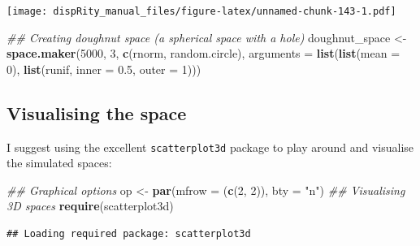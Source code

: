 \documentclass[
]{book}
\newenvironment{Shaded}{\begin{snugshade}}{\end{snugshade}}
\newcommand{\CommentTok}[1]{\textcolor[rgb]{0.56,0.35,0.01}{\textit{#1}}}
\newcommand{\DataTypeTok}[1]{\textcolor[rgb]{0.13,0.29,0.53}{#1}}
\newcommand{\DecValTok}[1]{\textcolor[rgb]{0.00,0.00,0.81}{#1}}
\newcommand{\FloatTok}[1]{\textcolor[rgb]{0.00,0.00,0.81}{#1}}
\newcommand{\KeywordTok}[1]{\textcolor[rgb]{0.13,0.29,0.53}{\textbf{#1}}}
\newcommand{\NormalTok}[1]{#1}
\newcommand{\StringTok}[1]{\textcolor[rgb]{0.31,0.60,0.02}{#1}}
\begin{document}
\texttt{[image: dispRity\_manual\_files/figure-latex/unnamed-chunk-143-1.pdf]}

\begin{Shaded}
\begin{Highlighting}[]
\CommentTok{\#\# Creating doughnut space (a spherical space with a hole)}
\NormalTok{doughnut\_space \textless{}{-}}\StringTok{ }\KeywordTok{space.maker}\NormalTok{(}\DecValTok{5000}\NormalTok{, }\DecValTok{3}\NormalTok{, }\KeywordTok{c}\NormalTok{(rnorm, random.circle),}
     \DataTypeTok{arguments =} \KeywordTok{list}\NormalTok{(}\KeywordTok{list}\NormalTok{(}\DataTypeTok{mean =} \DecValTok{0}\NormalTok{),}
                      \KeywordTok{list}\NormalTok{(runif, }\DataTypeTok{inner =} \FloatTok{0.5}\NormalTok{, }\DataTypeTok{outer =} \DecValTok{1}\NormalTok{)))}
\end{Highlighting}
\end{Shaded}

\hypertarget{visualising-the-space}{%
\subsection{Visualising the space}\label{visualising-the-space}}

I suggest using the excellent \texttt{scatterplot3d} package to play around and visualise the simulated spaces:

\begin{Shaded}
\begin{Highlighting}[]
\CommentTok{\#\# Graphical options}
\NormalTok{op \textless{}{-}}\StringTok{ }\KeywordTok{par}\NormalTok{(}\DataTypeTok{mfrow =}\NormalTok{ (}\KeywordTok{c}\NormalTok{(}\DecValTok{2}\NormalTok{, }\DecValTok{2}\NormalTok{)), }\DataTypeTok{bty =} \StringTok{"n"}\NormalTok{)}
\CommentTok{\#\# Visualising 3D spaces}
\KeywordTok{require}\NormalTok{(scatterplot3d)}
\end{Highlighting}
\end{Shaded}

\begin{verbatim}
## Loading required package: scatterplot3d
\end{verbatim}
\end{document}
